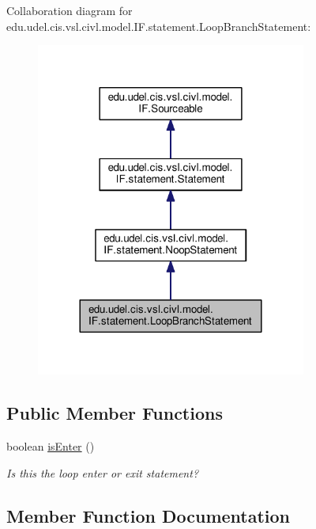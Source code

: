 Collaboration diagram for edu.\+udel.\+cis.\+vsl.\+civl.\+model.\+I\+F.\+statement.\+Loop\+Branch\+Statement\+:
\nopagebreak
\begin{figure}[H]
\begin{center}
\leavevmode
\includegraphics[width=252pt]{interfaceedu_1_1udel_1_1cis_1_1vsl_1_1civl_1_1model_1_1IF_1_1statement_1_1LoopBranchStatement__coll__graph}
\end{center}
\end{figure}
\subsection*{Public Member Functions}
\begin{DoxyCompactItemize}
\item 
boolean \hyperlink{interfaceedu_1_1udel_1_1cis_1_1vsl_1_1civl_1_1model_1_1IF_1_1statement_1_1LoopBranchStatement_afa07dbebdfb9955f5896b3ec10677865}{is\+Enter} ()
\begin{DoxyCompactList}\small\item\em Is this the loop enter or exit statement? \end{DoxyCompactList}\end{DoxyCompactItemize}


\subsection{Member Function Documentation}
\hypertarget{interfaceedu_1_1udel_1_1cis_1_1vsl_1_1civl_1_1model_1_1IF_1_1statement_1_1LoopBranchStatement_afa07dbebdfb9955f5896b3ec10677865}{}
